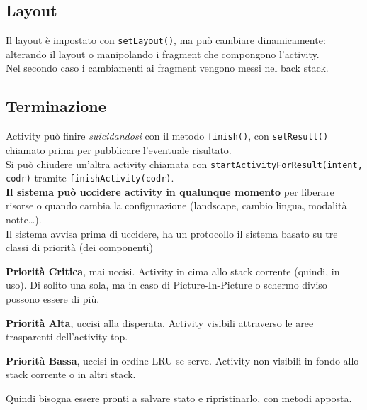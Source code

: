\documentclass[10pt]{book}
\begin{document}
\subsection{Layout}
Il layout è impostato con \texttt{setLayout()}, ma può cambiare dinamicamente: alterando il layout o manipolando i fragment che compongono l'activity.\\
Nel secondo caso i cambiamenti ai fragment vengono messi nel back stack.
\subsection{Terminazione}
Activity può finire \textit{suicidandosi} con il metodo \texttt{finish()}, con \texttt{setResult()} chiamato prima per pubblicare l'eventuale risultato.\\
Si può chiudere un'altra activity chiamata con \texttt{startActivityForResult(intent, codr)} tramite \texttt{finishActivity(codr)}.\\
\textbf{Il sistema può uccidere activity in qualunque momento} per liberare risorse o quando cambia la configurazione (landscape, cambio lingua, modalità notte\ldots).\\
Il sistema avvisa prima di uccidere, ha un protocollo il sistema basato su tre classi di priorità (dei componenti)
\begin{list}{}{}
	\item \textbf{Priorità Critica}, mai uccisi. Activity in cima allo stack corrente (quindi, in uso). Di solito una sola, ma in caso di Picture-In-Picture o schermo diviso possono essere di più.
	\item \textbf{Priorità Alta}, uccisi alla disperata. Activity visibili attraverso le aree trasparenti dell'activity top.
	\item \textbf{Priorità Bassa}, uccisi in ordine LRU se serve. Activity non visibili in fondo allo stack corrente o in altri stack.
\end{list}
Quindi bisogna essere pronti a salvare stato e ripristinarlo, con metodi apposta.
\end{document}

